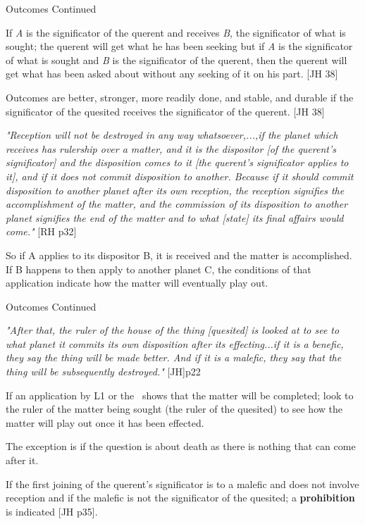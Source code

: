 \begin{frame}[t]{Outcomes Continued}

If \textsl{A} is the significator of the querent and receives \textsl{B}, the significator of what is sought; the querent will get what he has been seeking but if \textsl{A} is the significator of what is sought and \textsl{B} is the significator of the querent, then the querent will get what has been asked about without any seeking of it on his part. [JH 38]

Outcomes are better, stronger, more readily done, and stable, and durable if the significator of the quesited receives the significator of the querent. [JH 38]

\begin{block}{}
\textsl{"Reception will not be destroyed in any way whatsoever,...,if the planet which receives has rulership over a matter, and it is the dispositor [of the querent's significator] and the disposition comes to it [the querent's significator applies to it], and if it does not commit disposition to another. Because if it should commit disposition to another planet after its own reception, the reception signifies the accomplishment of the matter, and the commission of its disposition to another planet signifies the end of the matter and to what [state] its final affairs would come."} [RH p32]
\end{block}
So if A applies to its dispositor B, it is received and the matter is accomplished. If B happens to then apply to another planet C, the conditions of that application indicate how the matter will eventually play out.
\end{frame}
\begin{frame}[t]{Outcomes Continued}

\begin{block}{}
\textsl{"After that, the ruler of the house of the thing [quesited] is looked at to see to what planet it commits its own disposition after its effecting...if it is a benefic, they say the thing will be made better. And if it is a malefic, they say that the thing will be subsequently destroyed."} [JH]p22
\end{block}
If an application by L1 or the \Moon\ shows that the matter will be completed; look to the ruler of the matter being sought (the ruler of the quesited) to see how the matter will play out once it has been effected.

The exception is if the question is about death as there is nothing that can come after it.

If the first joining of the querent's significator is to a malefic and does not involve reception and if the malefic is not the significator of the quesited;  a \textbf{prohibition} is indicated [JH p35].

\end{frame}